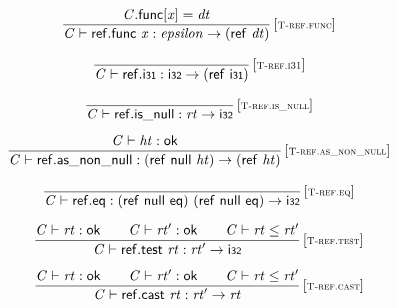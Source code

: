 $$
\begin{array}{@{}c@{}}\displaystyle
\frac{
{\mathit{C}}.\mathsf{func}{}[{\mathit{x}}] = {\mathit{dt}}
}{
{\mathit{C}} \vdash \mathsf{ref.func}~{\mathit{x}} : {\mathit{epsilon}} \rightarrow (\mathsf{ref}~{\mathit{dt}})
} \, {[\textsc{\scriptsize T{-}ref.func}]}
\qquad
\end{array}
$$

$$
\begin{array}{@{}c@{}}\displaystyle
\frac{
}{
{\mathit{C}} \vdash \mathsf{ref.i{\scriptstyle31}} : \mathsf{i{\scriptstyle32}} \rightarrow (\mathsf{ref}~\mathsf{i{\scriptstyle31}})
} \, {[\textsc{\scriptsize T{-}ref.i31}]}
\qquad
\end{array}
$$

$$
\begin{array}{@{}c@{}}\displaystyle
\frac{
}{
{\mathit{C}} \vdash \mathsf{ref.is\_null} : {\mathit{rt}} \rightarrow \mathsf{i{\scriptstyle32}}
} \, {[\textsc{\scriptsize T{-}ref.is\_null}]}
\qquad
\end{array}
$$

$$
\begin{array}{@{}c@{}}\displaystyle
\frac{
{\mathit{C}} \vdash {\mathit{ht}} : \mathsf{ok}
}{
{\mathit{C}} \vdash \mathsf{ref.as\_non\_null} : (\mathsf{ref}~\mathsf{null}~{\mathit{ht}}) \rightarrow (\mathsf{ref}~{\mathit{ht}})
} \, {[\textsc{\scriptsize T{-}ref.as\_non\_null}]}
\qquad
\end{array}
$$

$$
\begin{array}{@{}c@{}}\displaystyle
\frac{
}{
{\mathit{C}} \vdash \mathsf{ref.eq} : (\mathsf{ref}~\mathsf{null}~\mathsf{eq})~(\mathsf{ref}~\mathsf{null}~\mathsf{eq}) \rightarrow \mathsf{i{\scriptstyle32}}
} \, {[\textsc{\scriptsize T{-}ref.eq}]}
\qquad
\end{array}
$$

$$
\begin{array}{@{}c@{}}\displaystyle
\frac{
{\mathit{C}} \vdash {\mathit{rt}} : \mathsf{ok}
 \qquad
{\mathit{C}} \vdash {\mathit{rt}'} : \mathsf{ok}
 \qquad
{\mathit{C}} \vdash {\mathit{rt}} \leq {\mathit{rt}'}
}{
{\mathit{C}} \vdash \mathsf{ref.test}~{\mathit{rt}} : {\mathit{rt}'} \rightarrow \mathsf{i{\scriptstyle32}}
} \, {[\textsc{\scriptsize T{-}ref.test}]}
\qquad
\end{array}
$$

$$
\begin{array}{@{}c@{}}\displaystyle
\frac{
{\mathit{C}} \vdash {\mathit{rt}} : \mathsf{ok}
 \qquad
{\mathit{C}} \vdash {\mathit{rt}'} : \mathsf{ok}
 \qquad
{\mathit{C}} \vdash {\mathit{rt}} \leq {\mathit{rt}'}
}{
{\mathit{C}} \vdash \mathsf{ref.cast}~{\mathit{rt}} : {\mathit{rt}'} \rightarrow {\mathit{rt}}
} \, {[\textsc{\scriptsize T{-}ref.cast}]}
\qquad
\end{array}
$$

